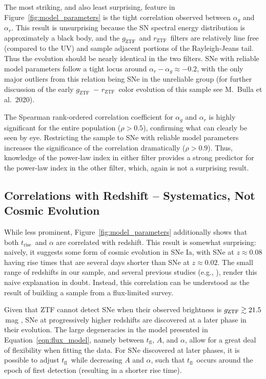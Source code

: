 \documentclass[twocolumn]{./aastex63}
\newcommand{\rztf}{$r_\mathrm{ZTF}$}
\newcommand{\gztf}{$g_\mathrm{ZTF}$}
\newcommand{\tfl}{$t_\mathrm{fl}$}
\newcommand{\trise}{$t_\mathrm{rise}$}
\begin{document}
The most striking, and also least surprising, feature in
Figure~\ref{fig:model_parameters} is the tight correlation observed between
$\alpha_g$ and $\alpha_r$. This result is unsurprising because the SN spectral
energy distribution is approximately a black body, and the \gztf\ and \rztf\
filters are relatively line free (compared to the UV) and sample adjacent
portions of the Rayleigh-Jeans tail. Thus the evolution should be nearly
identical in the two filters. SNe with reliable model parameters follow a
tight locus around $\alpha_r - \alpha_g \approx -0.2$, with the only major
outliers from this relation being SNe in the unreliable group (for further
discussion of the early \gztf\ $-$ \rztf\ color evolution of this sample see
M.~Bulla et al.\ 2020).

The Spearman rank-ordered correlation coefficient for $\alpha_g$
and $\alpha_r$ is highly significant for the entire population ($\rho >
0.5$), confirming what can clearly be seen by eye. Restricting the sample to
SNe with reliable model parameters increases the significance of the
correlation dramatically ($\rho > 0.9$). Thus, knowledge of the power-law
index in either filter provides a strong predictor for the power-law index
in the other filter, which, again is not a surprising result.

\subsection{Correlations with Redshift -- Systematics, Not Cosmic Evolution}\label{sec:redshift_correlations}

While less prominent, Figure~\ref{fig:model_parameters} additionally shows
that both \trise\ and $\alpha$ are correlated with redshift. This result is
somewhat surprising: naively, it suggests some form of cosmic evolution in SNe
Ia, with SNe at $z \approx 0.08$ having rise times that are several days
shorter than SNe at $z \approx 0.02$. The small range of redshifts in our
sample, and several previous studies (e.g., \citealt{Conley06,Jones19}),
render this naive explanation in doubt. Instead, this correlation can be
understood as the result of building a sample from a flux-limited survey.

Given that ZTF cannot detect SNe when their observed brightness is
$g_\mathrm{ZTF} \gtrsim 21.5$\,mag \citep{Masci19,Bellm19}, SNe at progressively
higher redshifts are discovered at a later phase in their evolution. The large
degeneracies in the model presented in Equation~\ref{eqn:flux_model}, namely
between \tfl, $A$, and $\alpha$, allow for a great deal of flexibility when
fitting the data. For SNe discovered at later phases, it is possible to adjust
\tfl\ while decreasing $A$ and $\alpha$, such that \tfl\ occurs around the epoch
of first detection (resulting in a shorter rise time).
\end{document}
